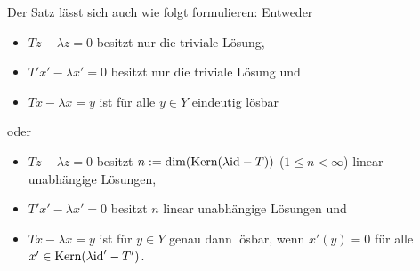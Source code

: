 \begin{Bem}
    Der Satz lässt sich auch wie folgt formulieren:
    Entweder
    \begin{itemize}
        \item
        $Tz - \lambda z = 0$ besitzt nur die triviale Lösung,
        
        \item
        $T'x' - \lambda x' = 0$ besitzt nur die triviale Lösung und
        
        \item
        $Tx - \lambda x = y$ ist für alle $y \in Y$ eindeutig lösbar
    \end{itemize}
    oder
    \begin{itemize}
        \item
        $Tz - \lambda z = 0$ besitzt $n := \dim(\text{Kern}(\lambda\text{id} - T))$
        ($1 \le n < \infty$) linear unabhängige Lösungen,
        
        \item
        $T'x' - \lambda x' = 0$ besitzt $n$ linear unabhängige Lösungen und
        
        \item
        $Tx - \lambda x = y$ ist für $y \in Y$ genau dann lösbar, wenn
        $x'(y) = 0$ für alle $x' \in \text{Kern}(\lambda\text{id}' - T')$.
    \end{itemize}
\end{Bem}

\pagebreak
